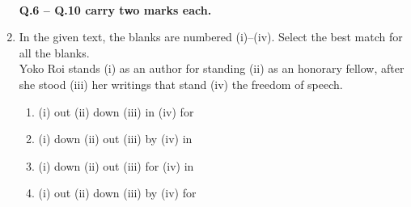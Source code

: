 \documentclass[journal]{IEEEtran}
\begin{document}
\begin{enumerate}[leftmargin=0pt]
\begin{enumerate}
\end{enumerate}
\hfill{}\\[0.5em]
\noindent\textbf{Q.6 -- Q.10 carry two marks each.}\\[0.5em]
\item In the given text, the blanks are numbered (i)--(iv). Select the best match for all the blanks. \\[0.5em]

Yoko Roi stands \underline{\hspace{1cm}} (i) as an author for standing \underline{\hspace{1cm}} (ii) as an honorary fellow, after she stood \underline{\hspace{1cm}} (iii) her writings that stand \underline{\hspace{1cm}} (iv) the freedom of speech. \\[1em]

\begin{enumerate}
\item (i) out \quad (ii) down \quad (iii) in \quad (iv) for
\item (i) down \quad (ii) out \quad (iii) by \quad (iv) in
\item (i) down \quad (ii) out \quad (iii) for \quad (iv) in
\item (i) out \quad (ii) down \quad (iii) by \quad (iv) for
\end{enumerate}

\hfill{}\\[0.5em]


\end{enumerate}
\end{document}
